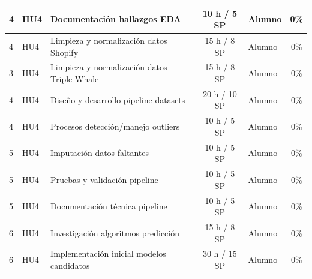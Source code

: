 \documentclass[
11pt, %
]{charter}
\begin{document}
\begin{table}[htpb]
\begin{tabularx}{\linewidth}{@{}|l|l|X|c|l|c|@{}}
4 & HU4 & Documentación hallazgos EDA & 10 h / 5 SP & Alumno & 0\% \\ \hline
4 & HU4 & Limpieza y normalización datos Shopify & 15 h / 8 SP & Alumno & 0\% \\ \hline
3 & HU4 & Limpieza y normalización datos Triple Whale & 15 h / 8 SP & Alumno & 0\% \\ \hline
4 & HU4 & Diseño y desarrollo pipeline datasets & 20 h / 10 SP & Alumno & 0\% \\ \hline
4 & HU4 & Procesos detección/manejo outliers & 10 h / 5 SP & Alumno & 0\% \\ \hline
5 & HU4 & Imputación datos faltantes & 10 h / 5 SP & Alumno & 0\% \\ \hline
5 & HU4 & Pruebas y validación pipeline & 10 h / 5 SP & Alumno & 0\% \\ \hline
5 & HU4 & Documentación técnica pipeline & 10 h / 5 SP & Alumno & 0\% \\ \hline
6 & HU4 & Investigación algoritmos predicción & 15 h / 8 SP & Alumno & 0\% \\ \hline
6 & HU4 & Implementación inicial modelos candidatos & 30 h / 15 SP & Alumno & 0\% \\ \hline
\end{tabularx}
\end{table}
\end{document}
